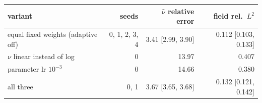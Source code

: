 \begin{tabular}{lrrr}
\toprule
variant & seeds & $\hat\nu$ relative error & field rel.\ $L^2$ \\
\midrule
equal fixed weights (adaptive off) & 0, 1, 2, 3, 4 & 3.41 [2.99, 3.90] & 0.112 [0.103, 0.133] \\
$\nu$ linear instead of log & 0 & 13.97 & 0.407 \\
parameter lr $10^{-3}$ & 0 & 14.66 & 0.380 \\
all three & 0, 1 & 3.67 [3.65, 3.68] & 0.132 [0.121, 0.142] \\
\bottomrule
\end{tabular}
